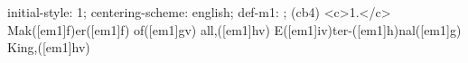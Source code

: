 initial-style: 1;
centering-scheme: english;
def-m1: \grealign;
(cb4) <c>1.</c> Mak([em1]f)er([em1]f) of([em1]gv) all,([em1]hv) E([em1]iv)ter-([em1]h)nal([em1]g) King,([em1]hv)
